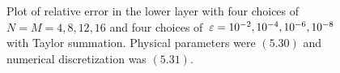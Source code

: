 \begin{figure}[H]
\vspace{3mm}
\caption{Plot of relative error in the lower layer with four choices of $N = M = 4, 8, 12, 16$
    and four choices of $\varepsilon = 10^{-2}, 10^{-4}, 10^{-6}, 10^{-8}$
    with Taylor summation.
    Physical parameters were $(5.30)$ and numerical
    discretization was $(5.31)$.}
\label{Fig:Eps}
\end{figure}